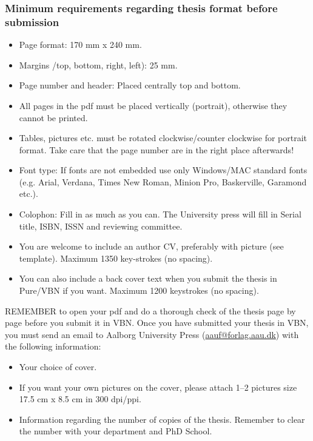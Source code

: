 \subsubsection{Minimum requirements regarding thesis format before submission}
\begin{itemize}
    \item Page format: 170 mm x 240 mm.
    \item Margins /top, bottom, right, left): 25 mm.
    \item Page number and header: Placed centrally top and bottom.
    \item All pages in the pdf must be placed vertically (portrait), otherwise they cannot be printed.
    \item Tables, pictures etc. must be rotated clockwise/counter clockwise for portrait format. Take care that the page number are in the right place afterwards!
    \item Font type: If fonts are not embedded use only Windows/MAC standard fonts (e.g. Arial, Verdana, Times New Roman, Minion Pro, Baskerville, Garamond etc.).
    \item Colophon: Fill in as much as you can. The University press will fill in Serial title, ISBN, ISSN and reviewing committee.
    \item You are welcome to include an author CV, preferably with picture (see template). Maximum 1350 key-strokes (no spacing).
    \item You can also include a back cover text when you submit the thesis in Pure/VBN if you want. Maximum 1200 keystrokes (no spacing).
\end{itemize}
REMEMBER to open your pdf and do a thorough check of the thesis page by page before you submit it in VBN. Once you have submitted your thesis in VBN, you must send an email to Aalborg University Press (\href{mailto:aauf@forlag.aau.dk}{aauf@forlag.aau.dk}) with the following information:
\begin{itemize}
    \item Your choice of cover.
    \item If you want your own pictures on the cover, please attach 1–2 pictures size 17.5 cm x 8.5 cm in 300 dpi/ppi.
    \item Information regarding the number of copies of the thesis. Remember to clear the number with your department and PhD School.
\end{itemize}

